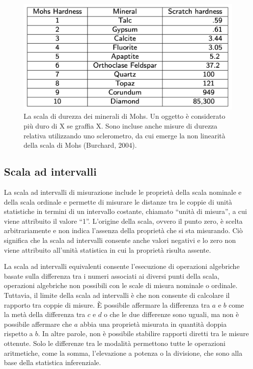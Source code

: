 \documentclass[
  letterpaper,
]{krantz}
\begin{document}
\begin{figure}[H]

{\centering \includegraphics[width=0.62\linewidth,height=\textheight,keepaspectratio]{chapters/key_notions/../../figures/mohs.png}

}

\caption{La scala di durezza dei minerali di Mohs. Un oggetto è
considerato più duro di X se graffia X. Sono incluse anche misure di
durezza relativa utilizzando uno sclerometro, da cui emerge la non
linearità della scala di Mohs (Burchard, 2004).}

\end{figure}%

\subsection{Scala ad intervalli}\label{scala-ad-intervalli}

La scala ad intervalli di misurazione include le proprietà della scala
nominale e della scala ordinale e permette di misurare le distanze tra
le coppie di unità statistiche in termini di un intervallo costante,
chiamato ``unità di misura'', a cui viene attribuito il valore ``1''.
L'origine della scala, ovvero il punto zero, è scelta arbitrariamente e
non indica l'assenza della proprietà che si sta misurando. Ciò significa
che la scala ad intervalli consente anche valori negativi e lo zero non
viene attribuito all'unità statistica in cui la proprietà risulta
assente.

La scala ad intervalli equivalenti consente l'esecuzione di operazioni
algebriche basate sulla differenza tra i numeri associati ai diversi
punti della scala, operazioni algebriche non possibili con le scale di
misura nominale o ordinale. Tuttavia, il limite della scala ad
intervalli è che non consente di calcolare il rapporto tra coppie di
misure. È possibile affermare la differenza tra \(a\) e \(b\) come la
metà della differenza tra \(c\) e \(d\) o che le due differenze sono
uguali, ma non è possibile affermare che \(a\) abbia una proprietà
misurata in quantità doppia rispetto a \(b\). In altre parole, non è
possibile stabilire rapporti diretti tra le misure ottenute. Solo le
differenze tra le modalità permettono tutte le operazioni aritmetiche,
come la somma, l'elevazione a potenza o la divisione, che sono alla base
della statistica inferenziale.
\end{document}
